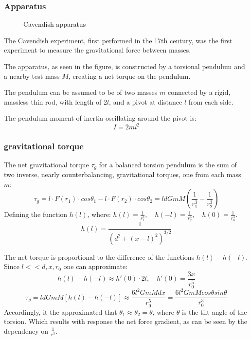 \documentclass[\main/master.tex]{subfiles}
\begin{document}
\subsubsection{Apparatus}
\begin{figure}[htbp]
	\centering
	\caption[Cavendish apparatus]{Cavendish apparatus \cite{howell2019}}
	\label{fig:Cavendish apparatus}
\end{figure}
\par\noindent
The Cavendish experiment, first performed in the 17th century, was the first experiment to measure the gravitational force between masses. 
\par\noindent
The apparatus, as seen in the figure, is constructed by a torsional pendulum and a nearby test mass $M$, creating a net torque on the pendulum. 
\par\noindent
The pendulum can be assumed to be of two masses $m$ connected by a rigid, massless thin rod, with length of $2l$, and a pivot at distance $l$ from each side.
\par\noindent
The pendulum moment of inertia oscillating around the pivot is:
\begin{equation}
I = 2ml^2     \label{eqn:moment_inertia}
\end{equation} 
\subsubsection{gravitational torque}
The net gravitational torque $\tau_g$ for a balanced torsion pendulum is the sum of two inverse, nearly counterbalancing, gravitational torques, one from each mass $m$:
\begin{equation}
\tau_g = l \cdot F(r_1) \cdot cos\theta_1 - l \cdot F(r_2) \cdot cos\theta_2 = l d GmM(\frac{1}{r_1^3} - \frac{1}{r_2^3})     \label{eqn:gravitation_torque}
\end{equation}
Defining the function $h(l)$, where: $h(l) = \frac{1}{r_1^3},\quad	h(-l) = \frac{1}{r_2^3},\quad	h(0) = \frac{1}{r_0^3}$.
\begin{equation}
h(l) = \frac{1}{(d^2 +(x-l)^2)^{3/2}} \label{eqn:gravitation_torque}
\end{equation}
\par\noindent
The net torque is proportional to the difference of the functions $h(l)-h(-l)$. Since $l<<d,x,r_0$ one can approximate:
\begin{equation}
h(l)-h(-l)\approx h'(0)\cdot 2l,\quad h'(0) = \frac{3x}{r_0^5}\label{eqn:approximation}
\end{equation}
\begin{equation}
\tau_g = l d GmM[h(l)-h(-l)]\approx \frac{6l^2GmMdx} {r_0^5} = \frac{6l^2GmMcos\theta sin\theta}{r_0^3}      \label{eqn:gravitation_torque}
\end{equation}
Accordingly, it the approximated that $\theta_1 \approx \theta_2 = \theta$, where $\theta$ is the tilt angle of the torsion. Which results with response the net force gradient, as can be seen by the dependency on $\frac{1}{r^3}$.
\end{document}

